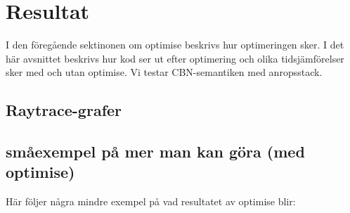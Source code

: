 \documentclass[Rapport]{subfiles}
\begin{document}
\section{Resultat}
\label{sec:Resultat}


I den föregående sektinonen om optimise beskrivs hur optimeringen sker.
I det här avsnittet beskrivs hur kod ser ut efter optimering och 
olika tidsjämförelser sker med och utan optimise. 
Vi testar CBN-semantiken med anropsstack.

\subsection{Raytrace-grafer}


    \begin {figure}
      \begin{center}
      \end{center}
    \end {figure}



\subsection{småexempel på mer man kan göra (med optimise)} 

Här följer några mindre exempel på vad resultatet av optimise blir:
\end{document}
